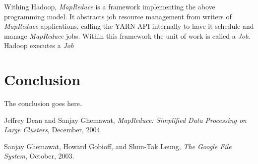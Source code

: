 \documentclass[conference]{IEEEtran}
\begin{document}
Withing Hadoop, \emph{MapReduce} is a framework implementing the above programming model. It abstracts job resource management from writers of \emph{MapReduce} applications, calling the YARN API internally to have it schedule and manage \emph{MapReduce} jobs. Within this framework the unit of work is called a \emph{Job}. Hadoop executes a \emph{Job} 

\section{Conclusion}
The conclusion goes here.


\begin{thebibliography}{1}
Jeffrey Dean and Sanjay Ghemawat, \emph{MapReduce: Simplified Data Processing on Large Clusters}, December, 2004.

Sanjay Ghemawat, Howard Gobioff, and Shun-Tak Leung, \emph{The Google File System}, October, 2003.

\end{thebibliography}
\end{document}
